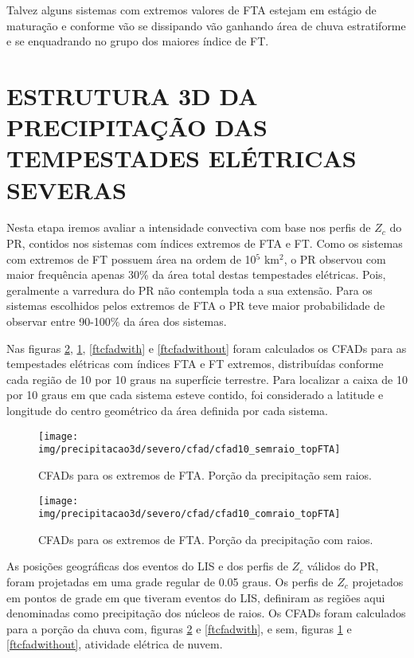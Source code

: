 Talvez alguns sistemas com extremos valores de FTA estejam em estágio de maturação e conforme vão se dissipando vão ganhando área de chuva estratiforme e se enquadrando no grupo dos maiores índice de FT. 



\section{ESTRUTURA 3D DA PRECIPITAÇÃO DAS TEMPESTADES ELÉTRICAS SEVERAS}

Nesta etapa iremos avaliar a intensidade convectiva com base nos perfis de $Z_c$ do PR, contidos nos sistemas com índices extremos de FTA e FT. Como os sistemas com extremos de FT possuem área na ordem de 10$^5$ km$^2$, o PR observou com maior frequência apenas  30\% da área total destas tempestades elétricas. Pois, geralmente a varredura do PR não contempla toda a sua extensão. Para os sistemas escolhidos pelos extremos de FTA o PR teve maior probabilidade de observar entre 90-100\% da área dos sistemas.

Nas figuras \ref{ftacfadwith}, \ref{ftacfadwithout}, \ref{ftcfadwith} e \ref{ftcfadwithout} foram calculados os CFADs para as tempestades elétricas com índices FTA e FT extremos, distribuídas conforme cada região de 10 por 10 graus na superfície terrestre. Para localizar a caixa de 10 por 10 graus em que cada sistema esteve contido, foi considerado a latitude e longitude do centro geométrico da área definida por cada sistema.


\begin{figure}[!ht]
  \centering
  \texttt{[image: img/precipitacao3d/severo/cfad/cfad10\_semraio\_topFTA]}
 \caption{CFADs para os extremos de FTA. Porção da precipitação sem raios.}
 \label{ftacfadwithout}
\end{figure} 

\begin{figure}[!ht]
  \centering
  \texttt{[image: img/precipitacao3d/severo/cfad/cfad10\_comraio\_topFTA]}
  \caption{CFADs para os extremos de FTA. Porção da precipitação com raios.}
  \label{ftacfadwith}   
\end{figure} 

As posições geográficas dos eventos do LIS e dos perfis de $Z_c$ válidos do PR, foram projetadas em uma grade regular de 0.05 graus. Os perfis de $Z_c$ projetados em pontos de grade em que tiveram eventos do LIS, definiram as regiões aqui denominadas como precipitação dos núcleos de raios. Os CFADs foram calculados para a porção da chuva com, figuras \ref{ftacfadwith} e \ref{ftcfadwith}, e sem, figuras \ref{ftacfadwithout} e \ref{ftcfadwithout}, atividade elétrica de nuvem.


